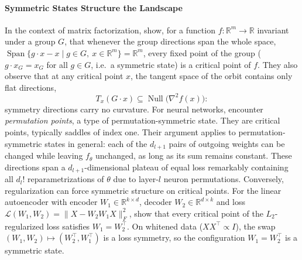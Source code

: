 \documentclass[mathematics,review,submit,moreauthors]{Definitions/mdpi}
\begin{document}
\paragraph{Symmetric States Structure the Landscape}
In the context of matrix factorization, \citet{li2018} show, for a function $f:\mathbb{R}^m\to\mathbb{R}$ invariant under a group $G$, that whenever the group directions span the whole space, $\operatorname{Span}\{g\cdot x-x \mid g\in G,\ x\in\mathbb{R}^m\}=\mathbb{R}^m$, every fixed point of the group ($g\cdot x_G=x_G$ for all $g\in G$, i.e.\ a symmetric state) is a critical point of $f$.
They also observe that at any critical point $x$, the tangent space of the orbit contains only flat directions,
\begin{equation*}
    T_x(G\cdot x)\subseteq\operatorname{Null}\big(\nabla^2 f(x)\big):
\end{equation*}
symmetry directions carry no curvature.
For neural networks, \citet{brea2019} encounter \emph{permutation points}, a type of permutation-symmetric state.
They are critical points, typically saddles of index one.
Their argument applies to permutation-symmetric states in general: each of the $d_{l+1}$ pairs of outgoing weights can be changed while leaving $f_\theta$ unchanged, as long as its sum remains constant.
These directions span a $d_{l+1}$-dimensional plateau of equal loss remarkably containing all $d_l!$ reparametrizations of $\theta$ due to layer-$l$ neuron permutations.
Conversely, regularization can force symmetric structure on critical points.
For the linear autoencoder with encoder $W_1\in\mathbb{R}^{k\times d}$, decoder $W_2\in\mathbb{R}^{d\times k}$ and loss $\mathcal{L}(W_1,W_2)=\lVert X-W_2W_1X\rVert_F^2$, \citet{kunin2019p3icml} show that every critical point of the $L_2$-regularized loss satisfies $W_1=W_2^{\top}$. On whitened data ($XX^\top\propto I$), the swap $(W_1,W_2)\mapsto(W_2^{\top},W_1^{\top})$ is a loss symmetry, so the configuration $W_1=W_2^{\top}$ is a symmetric state.
\end{document}
